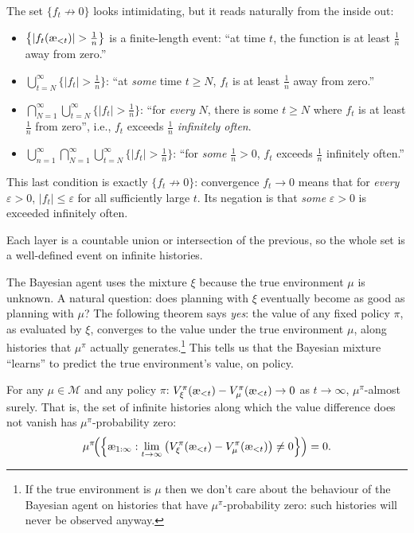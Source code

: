 \documentclass[fontsize=11pt, parskip=half]{scrartcl}
\newcommand{\cM}{\mathcal{M}}
\newcommand{\aes}{\textnormal{\ae}}
\begin{document}
\begin{example}
The set $\{f_t \not\to 0\}$ looks intimidating, but it reads naturally from the inside out:
\begin{itemize}\itemsep=4pt
    \item $\big\{|f_t(\aes_{<t})| > \tfrac{1}{n}\big\}$ is a finite-length event: ``at time $t$, the function is at least $\tfrac{1}{n}$ away from zero.''

    \item $\bigcup_{t=N}^\infty \big\{|f_t| > \tfrac{1}{n}\big\}$: ``at \emph{some} time $t \geq N$, $f_t$ is at least $\tfrac{1}{n}$ away from zero.''

    \item $\bigcap_{N=1}^\infty \bigcup_{t=N}^\infty \big\{|f_t| > \tfrac{1}{n}\big\}$: ``for \emph{every} $N$, there is some $t \geq N$ where $f_t$ is at least $\tfrac{1}{n}$ from zero'', i.e., $f_t$ exceeds $\tfrac{1}{n}$ \emph{infinitely often}.

    \item $\bigcup_{n=1}^\infty \bigcap_{N=1}^\infty \bigcup_{t=N}^\infty \big\{|f_t| > \tfrac{1}{n}\big\}$: ``for \emph{some} $\tfrac{1}{n} > 0$, $f_t$ exceeds $\tfrac{1}{n}$ infinitely often.''
\end{itemize}
This last condition is exactly $\{f_t \not\to 0\}$: convergence $f_t \to 0$ means that for \emph{every} $\varepsilon > 0$, $|f_t| \leq \varepsilon$ for all sufficiently large $t$. Its negation is that \emph{some} $\varepsilon > 0$ is exceeded infinitely often.

Each layer is a countable union or intersection of the previous, so the whole set is a well-defined event on infinite histories.
\end{example}


The Bayesian agent uses the mixture $\xi$ because the true environment $\mu$ is unknown.
A natural question: does planning with $\xi$ eventually become as good as planning with $\mu$?
The following theorem says \emph{yes}: the value of any fixed policy $\pi$, as evaluated by $\xi$, converges to the value under the true environment $\mu$, along histories that $\mu^\pi$ actually generates.\footnote{If the true environment is $\mu$ then we don't care about the behaviour of the Bayesian agent on histories that have $\mu^\pi$-probability zero: such histories will never be observed anyway.}
This tells us that the Bayesian mixture ``learns'' to predict the true environment's value, on policy.

\begin{theorem}\label{thm:on_policy}
For any $\mu \in \cM$ and any policy $\pi$:
$V_\xi^\pi(\aes_{<t}) - V_\mu^\pi(\aes_{<t}) \to 0$ as $t \to \infty$, $\mu^\pi$-almost surely.
That is, the set of infinite histories along which the value difference does not vanish has $\mu^\pi$-probability zero:
\[
    \mu^\pi\!\Big(\Big\{\aes_{1:\infty} : \lim_{t \to \infty} \big(V_\xi^\pi(\aes_{<t}) - V_\mu^\pi(\aes_{<t})\big) \neq 0\Big\}\Big) = 0.
\]
\end{theorem}
\end{document}
